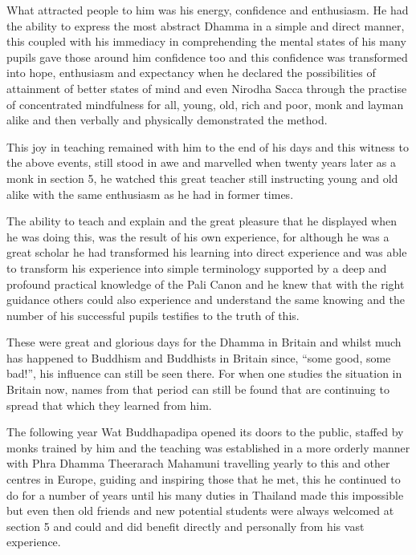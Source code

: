 \documentclass[a5paper,10pt,english]{book}
\begin{document}
\sphinxAtStartPar
What attracted people to him was his energy, confidence and enthusiasm. He had the ability to express the most abstract Dhamma in a simple and direct manner, this coupled with his immediacy in comprehending the mental states of his many pupils gave those around him confidence too and this confidence was transformed into hope, enthusiasm and expectancy when he declared the possibilities of attainment of better states of mind and even Nirodha Sacca through the practise of concentrated mindfulness for all, young, old, rich and poor, monk and layman alike and then verbally and physically demonstrated the method.

\sphinxAtStartPar
This joy in teaching remained with him to the end of his days and this witness to the above events, still stood in awe and marvelled when twenty years later as a monk in section 5, he watched this great teacher still instructing young and old alike with the same enthusiasm as he had in former times.

\sphinxAtStartPar
The ability to teach and explain and the great pleasure that he displayed when he was doing this, was the result of his own experience, for although he was a great scholar he had transformed his learning into direct experience and was able to transform his experience into simple terminology supported by a deep and profound practical knowledge of the Pali Canon and he knew that with the right guidance others could also experience and understand the same knowing and the number of his successful pupils testifies to the truth of this.

\sphinxAtStartPar
These were great and glorious days for the Dhamma in Britain and whilst much has happened to Buddhism and Buddhists in Britain since, “some good, some bad!”, his influence can still be seen there. For when one studies the situation in Britain now, names from that period can still be found that are continuing to spread that which they learned from him.

\sphinxAtStartPar
The following year Wat Buddhapadipa opened its doors to the public, staffed by monks trained by him and the teaching was established in a more orderly manner with Phra Dhamma Theerarach Mahamuni travelling yearly to this and other centres in Europe, guiding and inspiring those that he met, this he continued to do for a number of years until his many duties in Thailand made this impossible but even then old friends and new potential students were always welcomed at section 5 and could and did benefit directly and personally from his vast experience.
\end{document}

